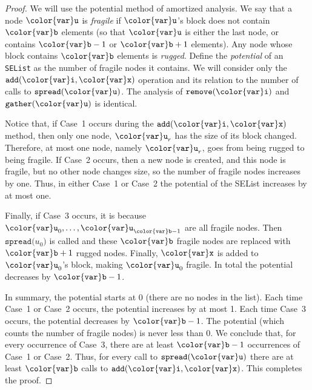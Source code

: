 \documentclass[10pt]{book}
\theoremstyle{plain}
\theoremstyle{definition}
\begin{document}
\begin{proof}
  We will use the potential method of amortized analysis.
  We say that
  a node \ensuremath{\mathtt{{\color{var}u}}} is \emph{fragile} if \ensuremath{\mathtt{{\color{var}u}}}'s block does not contain \ensuremath{\mathtt{{\color{var}b}}}
  elements (so that \ensuremath{\mathtt{{\color{var}u}}} is either the last node, or contains $\ensuremath{\mathtt{{\color{var}b}}}-1$
  or $\ensuremath{\mathtt{{\color{var}b}}}+1$ elements).  Any node whose block contains \ensuremath{\mathtt{{\color{var}b}}} elements is
  \emph{rugged}. Define the \emph{potential} of an \texttt{SEList} as the number
  of fragile nodes it contains.  We will consider only the \ensuremath{\mathtt{add({\color{var}i},{\color{var}x})}}
  operation and its relation to the number of calls to \ensuremath{\mathtt{spread({\color{var}u})}}.
  The analysis of \ensuremath{\mathtt{remove({\color{var}i})}} and \ensuremath{\mathtt{gather({\color{var}u})}} is identical.

  Notice that, if Case~1 occurs during the \ensuremath{\mathtt{add({\color{var}i},{\color{var}x})}} method, then
  only one node, $\ensuremath{\mathtt{{\color{var}u}}}_r$ has the size of its block changed. Therefore,
  at most one node, namely $\ensuremath{\mathtt{{\color{var}u}}}_r$, goes from being rugged to being
  fragile.  If Case~2 occurs, then a new node is created, and this node
  is fragile, but no other node changes size, so the number of fragile
  nodes increases by one.  Thus, in either Case~1 or Case~2 the potential
  of the SEList increases by at most one.

  Finally, if Case~3 occurs, it is because $\ensuremath{\mathtt{{\color{var}u}}}_0,\ldots,\ensuremath{\mathtt{{\color{var}u}}}_{\ensuremath{\mathtt{{\color{var}b}}}-1}$
  are all fragile nodes.  Then $\ensuremath{\mathtt{spread(}}u_0\ensuremath{\mathtt{)}}$ is called and these \ensuremath{\mathtt{{\color{var}b}}}
  fragile nodes are replaced with $\ensuremath{\mathtt{{\color{var}b}}}+1$ rugged nodes.  Finally, \ensuremath{\mathtt{{\color{var}x}}}
  is added to $\ensuremath{\mathtt{{\color{var}u}}}_0$'s block, making $\ensuremath{\mathtt{{\color{var}u}}}_0$ fragile.  In total the
  potential decreases by $\ensuremath{\mathtt{{\color{var}b}}}-1$.

  In summary, the potential starts at 0 (there are no nodes in the list).
  Each time Case~1 or Case~2 occurs, the potential increases by at
  most 1.  Each time Case~3 occurs, the potential decreases by $\ensuremath{\mathtt{{\color{var}b}}}-1$.
  The potential (which counts the number of fragile nodes) is never
  less than 0.  We conclude that, for every occurrence of Case~3, there
  are at least $\ensuremath{\mathtt{{\color{var}b}}}-1$ occurrences of Case~1 or Case~2.  Thus, for every
  call to \ensuremath{\mathtt{spread({\color{var}u})}} there are at least \ensuremath{\mathtt{{\color{var}b}}} calls to \ensuremath{\mathtt{add({\color{var}i},{\color{var}x})}}.  This
  completes the proof.
\end{proof}
\end{document}
